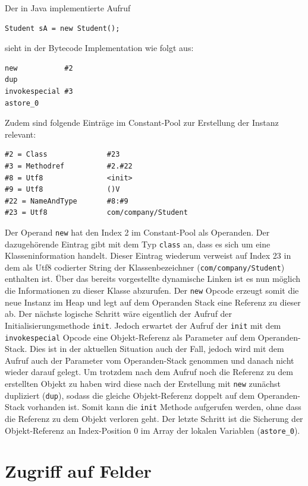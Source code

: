 \documentclass[conference]{IEEEtran}
\begin{document}
Der in Java implementierte Aufruf
\begin{lstlisting}
Student sA = new Student();
\end{lstlisting}
sieht in der Bytecode Implementation wie folgt aus:
\begin{lstlisting}
new           #2                  
dup
invokespecial #3                 
astore_0
\end{lstlisting}
Zudem sind folgende Einträge im Constant-Pool zur Erstellung der Instanz relevant:
\begin{lstlisting}
#2 = Class              #23
#3 = Methodref          #2.#22
#8 = Utf8               <init>
#9 = Utf8               ()V
#22 = NameAndType       #8:#9
#23 = Utf8              com/company/Student
\end{lstlisting}
Der Operand \verb|new| hat den Index 2 im Constant-Pool als Operanden. Der dazugehörende Eintrag gibt mit dem Typ \verb|class| an, dass es sich um eine Klasseninformation handelt. Dieser Eintrag wiederum verweist auf Index 23 in dem als Utf8 codierter String der Klassenbezeichner (\verb|com/company/Student|) enthalten ist. Über das bereits vorgestellte dynamische Linken ist es nun möglich die Informationen zu dieser Klasse abzurufen. Der \verb|new| Opcode erzeugt somit die neue Instanz im Heap und legt auf dem Operanden Stack eine Referenz zu dieser ab. Der nächste logische Schritt wäre eigentlich der Aufruf der Initialisierungsmethode \verb|init|. Jedoch erwartet der Aufruf der \verb|init| mit dem \verb|invokespecial| Opcode eine Objekt-Referenz als Parameter auf dem Operanden-Stack. Dies ist in der aktuellen Situation auch der Fall, jedoch wird mit dem Aufruf auch der Parameter vom Operanden-Stack genommen und danach nicht wieder darauf gelegt. Um trotzdem nach dem Aufruf noch die Referenz zu dem erstellten Objekt zu haben wird diese nach der Erstellung mit \verb|new| zunächst dupliziert (\verb|dup|), sodass die gleiche Objekt-Referenz doppelt auf dem Operanden-Stack vorhanden ist. Somit kann die \verb|init| Methode aufgerufen werden, ohne dass die Referenz zu dem Objekt verloren geht. Der letzte Schritt ist die Sicherung der Objekt-Referenz an Index-Position 0 im Array der lokalen Variablen (\verb|astore_0|).


\section{Zugriff auf Felder}
\end{document}
